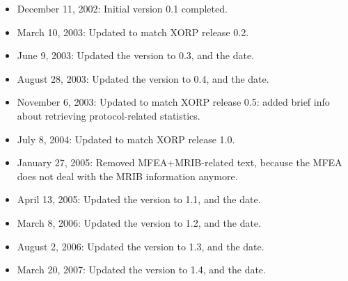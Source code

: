 \documentclass[11pt]{article}
\begin{document}
\begin{itemize}

  \item December 11, 2002: Initial version 0.1 completed.

  \item March 10, 2003: Updated to match XORP release 0.2.

  \item June 9, 2003: Updated the version to 0.3, and the date.

  \item August 28, 2003: Updated the version to 0.4, and the date.

  \item November 6, 2003: Updated to match XORP release 0.5: added brief info
  about retrieving protocol-related statistics.

  \item July 8, 2004: Updated to match XORP release 1.0.

  \item January 27, 2005: Removed MFEA+MRIB-related text, because the MFEA
  does not deal with the MRIB information anymore.

  \item April 13, 2005: Updated the version to 1.1, and the date.

  \item March 8, 2006: Updated the version to 1.2, and the date.

  \item August 2, 2006: Updated the version to 1.3, and the date.

  \item March 20, 2007: Updated the version to 1.4, and the date.

\end{itemize}




\end{document}
